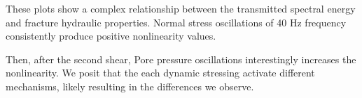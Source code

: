  
% 
 
 These plots show a complex relationship between the transmitted spectral energy and fracture hydraulic properties. Normal stress oscillations of 40 Hz frequency consistently produce positive nonlinearity values. 
 
 Then, after the second shear, Pore pressure oscillations interestingly increases the nonlinearity. We posit that the each dynamic stressing activate different mechanisms, likely resulting in the differences we observe. 